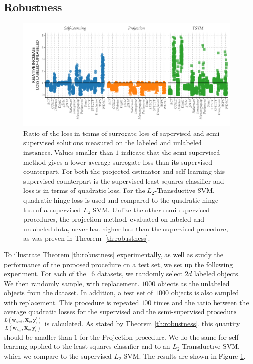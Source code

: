 \documentclass[twoside]{memoir}\usepackage[]{graphicx}\usepackage{xcolor}
\makeatletter
\def\maxwidth{ %
  \ifdim\Gin@nat@width>\linewidth
    \linewidth
  \else
    \Gin@nat@width
  \fi
}
\newenvironment{knitrout}{}{} %
\newcommand{\Xe}{\mathbf{X}_\mathrm{e}  }
\renewcommand{\vec}{\mathbf}
\makeatother
\begin{document}
\subsection{Robustness}
\begin{knitrout}
\color{fgcolor}\begin{figure}
\includegraphics[width=\maxwidth]{figure/lossdifference-1} \caption{Ratio of the loss in terms of surrogate loss of supervised and semi-supervised solutions measured on the labeled and unlabeled instances. Values smaller than $1$ indicate that the semi-supervised method gives a lower average surrogate loss than its supervised counterpart. For both the projected estimator and self-learning this supervised counterpart is the supervised least squares classifier and loss is in terms of quadratic loss. For the $L_2$-Transductive SVM, quadratic hinge loss is used and compared to the quadratic hinge loss of a supervised $L_2$-SVM. Unlike the other semi-supervised procedures, the projection method, evaluated on labeled and unlabeled data, never has higher loss than the supervised procedure, as was proven in Theorem~\ref{th:robustness}.}\label{fig:lossdifference}
\end{figure}


\end{knitrout}

To illustrate Theorem \ref{th:robustness} experimentally, as well as study the performance of the proposed procedure on a test set, we set up the following experiment. For each of the $16$ datasets, we randomly select $2 d$ labeled objects. We then randomly sample, with replacement, $1000$ objects as the unlabeled objects from the dataset. In addition, a test set of $1000$ objects is also sampled with replacement. This procedure is repeated $100$ times and the ratio between the average quadratic losses for the supervised and the semi-supervised procedure $\tfrac{L(\vec{w}_\text{semi},\Xe,\vec{y}_\text{e}^{\ast})}{L(\vec{w}_\text{sup},\Xe,\vec{y}_\text{e}^{\ast})}$ is calculated. As stated by Theorem \ref{th:robustness}, this quantity should be smaller than $1$ for the Projection procedure. We do the same for self-learning applied to the least squares classifier and to an $L_2$-Transductive SVM, which we compare to the supervised $L_2$-SVM. The results are shown in Figure \ref{fig:lossdifference}. 
\end{document}
